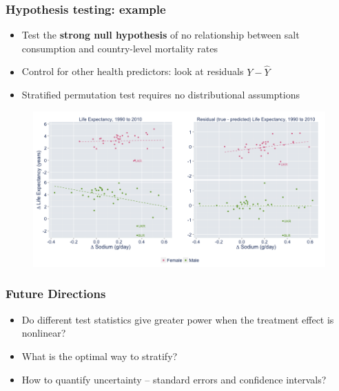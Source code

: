 \documentclass{beamer}
\begin{document}
\frame
{
  \frametitle{Hypothesis testing: example}
\begin{center}
\begin{itemize}
\item Test the \textbf{strong null hypothesis} of no relationship between salt consumption and country-level mortality rates
\item Control for other health predictors: look at residuals $Y - \hat{Y}$
\item Stratified permutation test requires no distributional assumptions
\end{itemize}

\begin{figure}[htbp]
\begin{center}
\includegraphics[width = \textwidth]{fig/sodium_lifeexp.png}
\end{center}
\end{figure}


\end{center}
}

\frame
{
  \frametitle{Future Directions}
\begin{center}
\begin{itemize}
\item Do different test statistics give greater power when the treatment effect is nonlinear?
\item What is the optimal way to stratify?
\item How to quantify uncertainty -- standard errors and confidence intervals?
\end{itemize}
\end{center}
}



%
%
%
\end{document}
